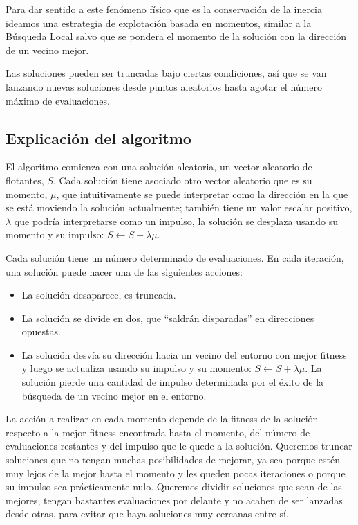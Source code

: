 \documentclass{article}
\begin{document}
Para dar sentido a este fenómeno físico que es la conservación de la inercia ideamos una estrategia de explotación basada en momentos, similar
a la Búsqueda Local salvo que se pondera el momento de la solución con la dirección de un vecino mejor.

Las soluciones pueden ser truncadas bajo ciertas
condiciones, así que se van lanzando nuevas soluciones desde puntos aleatorios hasta agotar el número máximo de evaluaciones.

\subsection{Explicación del algoritmo}

El algoritmo comienza con una solución aleatoria, un vector aleatorio de flotantes, $S$. Cada solución tiene asociado otro vector aleatorio que es
su momento, $\mu$, que intuitivamente se puede interpretar como la dirección en la que se está moviendo la solución actualmente; también tiene un
valor escalar positivo, $\lambda$ que podría interpretarse como un impulso, la solución se desplaza usando su momento y su impulso:
$S\gets S+\lambda\mu$.

Cada solución tiene un número determinado de evaluaciones. En cada iteración, una solución puede hacer una de las siguientes acciones:
\begin{itemize}
	\item La solución desaparece, es truncada.
	\item La solución se divide en dos, que ``saldrán disparadas'' en direcciones opuestas.
	\item La solución desvía su dirección hacia un vecino del entorno con mejor fitness y luego se actualiza usando su impulso y su momento: $S\gets S+\lambda\mu$. La solución pierde una cantidad de impulso determinada por el éxito de la búsqueda de un vecino mejor en el entorno.
\end{itemize}
La acción a realizar en cada momento depende de la fitness de la solución respecto a la mejor fitness encontrada hasta el momento, del número de evaluaciones restantes y del impulso que le quede a la solución. Queremos truncar soluciones que no tengan muchas posibilidades de mejorar, ya sea porque
estén muy lejos de la mejor hasta el momento y les queden pocas iteraciones o porque su impulso sea prácticamente nulo. Queremos dividir soluciones
que sean de las mejores, tengan bastantes evaluaciones por delante y no acaben de ser lanzadas desde otras, para evitar que haya soluciones muy
cercanas entre sí.
\end{document}
